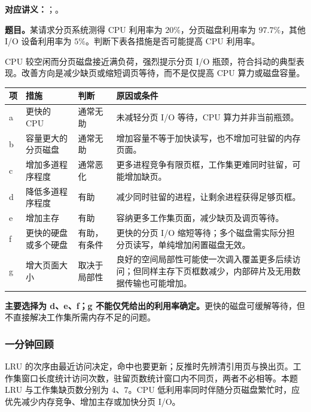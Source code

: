 \par\medskip
\begin{minipage}{\textwidth}

\textbf{对应讲义：}；。

\textbf{题目。}某请求分页系统测得 CPU 利用率为 $20\%$，分页磁盘利用率为 $97.7\%$，其他 I/O 设备利用率为 $5\%$。判断下表各措施是否可能提高 CPU 利用率。\par
\end{minipage}

\begin{checkedsolution}
CPU 较空闲而分页磁盘接近满负荷，强烈提示分页 I/O 瓶颈，符合抖动的典型表现。改善方向是减少缺页或缩短调页等待，而不是仅提高 CPU 算力或磁盘容量。

{\small
\begin{longtable}{@{}p{0.4cm}>{\raggedright\arraybackslash}p{3.45cm}>{\raggedright\arraybackslash}p{1.7cm}>{\raggedright\arraybackslash}p{\dimexpr\textwidth-5.55cm-6\tabcolsep\relax}@{}}
\toprule
项 & 措施 & 判断 & 原因或条件 \\
\midrule
\endhead
\bottomrule
\endfoot
a & 更快的 CPU & 通常无助 & 未减轻分页 I/O 等待，CPU 算力并非当前瓶颈。 \\
b & 容量更大的分页磁盘 & 通常无助 & 增加容量不等于加快读写，也不增加可驻留的内存页面。 \\
c & 增加多道程序程度 & 通常恶化 & 更多进程竞争有限页框，工作集更难同时驻留，可能增加缺页。 \\
d & 降低多道程序程度 & 有助 & 减少同时驻留的进程，让剩余进程获得足够页框。 \\
e & 增加主存 & 有助 & 容纳更多工作集页面，减少缺页及调页等待。 \\
f & 更快的硬盘或多个硬盘 & 有助，有条件 & 更快的分页 I/O 缩短等待；多个磁盘需实际分担分页读写，单纯增加闲置磁盘无效。 \\
g & 增大页面大小 & 取决于局部性 & 良好的空间局部性可能使一次调入覆盖更多后续访问；但同样主存下页框数减少，内部碎片及无用数据传输也可能增加。 \\
\end{longtable}
}

\textbf{主要选择为 d、e、f；g 不能仅凭给出的利用率确定。}更快的磁盘可缓解等待，但不直接解决工作集所需内存不足的问题。
\end{checkedsolution}

\subsubsection*{一分钟回顾}

LRU 的次序由最近访问决定，命中也要更新；反推时先辨清引用页与换出页。工作集窗口长度统计访问次数，驻留页数统计窗口内不同页，两者不必相等。本题 LRU 与工作集缺页数分别为 $4$、$7$。CPU 低利用率同时伴随分页磁盘繁忙时，应优先减少内存竞争、增加主存或加快分页 I/O。

\endgroup
